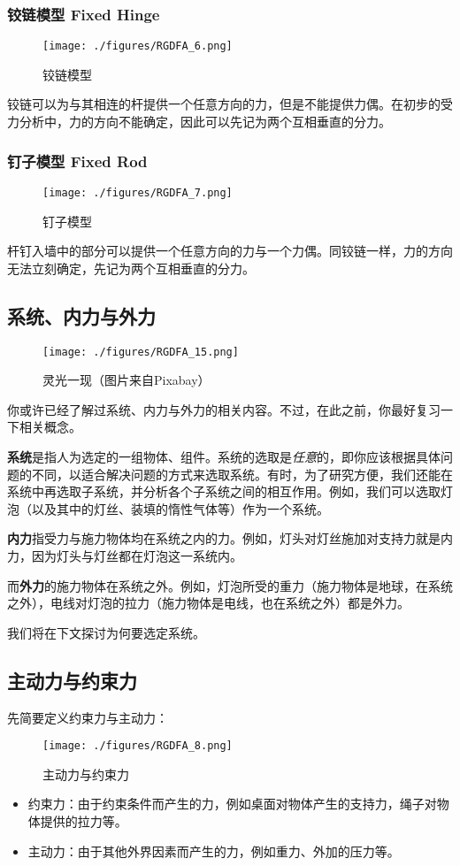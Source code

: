 \subsubsection{铰链模型 Fixed Hinge}
\begin{figure}[ht]
\centering
\texttt{[image: ./figures/RGDFA\_6.png]}
\caption{铰链模型} \label{RGDFA_fig6}
\end{figure}
铰链可以为与其相连的杆提供一个任意方向的力，但是不能提供力偶。在初步的受力分析中，力的方向不能确定，因此可以先记为两个互相垂直的分力。
\subsubsection{钉子模型 Fixed Rod}
\begin{figure}[ht]
\centering
\texttt{[image: ./figures/RGDFA\_7.png]}
\caption{钉子模型} \label{RGDFA_fig7}
\end{figure}
杆钉入墙中的部分可以提供一个任意方向的力与一个力偶。同铰链一样，力的方向无法立刻确定，先记为两个互相垂直的分力。

\subsection{系统、内力与外力}
\begin{figure}[ht]
\centering
\texttt{[image: ./figures/RGDFA\_15.png]}
\caption{灵光一现（图片来自Pixabay）} \label{RGDFA_fig15}
\end{figure}

你或许已经了解过系统、内力与外力的相关内容。不过，在此之前，你最好复习一下相关概念。

\textbf{系统}是指人为选定的一组物体、组件。系统的选取是\textsl{任意}的，即你应该根据具体问题的不同，以适合解决问题的方式来选取系统。有时，为了研究方便，我们还能在系统中再选取子系统，并分析各个子系统之间的相互作用。例如，我们可以选取灯泡（以及其中的灯丝、装填的惰性气体等）作为一个系统。

\textbf{内力}指受力与施力物体均在系统之内的力。例如，灯头对灯丝施加对支持力就是内力，因为灯头与灯丝都在灯泡这一系统内。

而\textbf{外力}的施力物体在系统之外。例如，灯泡所受的重力（施力物体是地球，在系统之外），电线对灯泡的拉力（施力物体是电线，也在系统之外）都是外力。

我们将在下文探讨为何要选定系统。

\subsection{主动力与约束力}
先简要定义约束力与主动力：
\begin{figure}[ht]
\centering
\texttt{[image: ./figures/RGDFA\_8.png]}
\caption{主动力与约束力} \label{RGDFA_fig8}
\end{figure}
\begin{itemize}
\item 约束力：由于约束条件而产生的力，例如桌面对物体产生的支持力，绳子对物体提供的拉力等。
\item 主动力：由于其他外界因素而产生的力，例如重力、外加的压力等。
\end{itemize}

